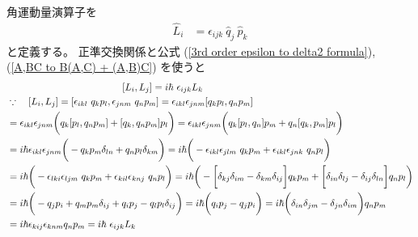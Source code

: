 角運動量演算子を
\begin{align}
    \hat{L}_i &= \epsilon_{ijk} \ \hat{q}_j \ \hat{p}_k
\end{align}
と定義する。
正準交換関係と公式
(\ref{3rd order epsilon to delta2 formula}),
(\ref{A,BC to B(A,C) + (A,B)C})
を使うと
\begin{align}
    &\qquad\qquad\qquad\qquad
    \qquad\qquad
    [
        \hat{L}_i, \hat{L}_j
    ]
    = i \hbar\ \epsilon_{ijk} \hat{L}_k
\label{angular momentum algebra}
\\&\because\quad
    [
        \hat{L}_i, \hat{L}_j
    ]
    =
    [
        \epsilon_{ikl} \ \hat{q}_k \hat{p}_l
        ,
        \epsilon_{jnm} \ \hat{q}_n \hat{p}_m
    ]
    =
    \epsilon_{ikl} \epsilon_{jnm}
    [
        \hat{q}_k \hat{p}_l
        ,
        \hat{q}_n \hat{p}_m
    ]
\notag\\&=
    \epsilon_{ikl} \epsilon_{jnm}
    \bigg(
        \hat{q}_k
        [
            \hat{p}_l
            ,
            \hat{q}_n \hat{p}_m
        ]
    +
        [
            \hat{q}_k
            ,
            \hat{q}_n \hat{p}_m
        ]
        \hat{p}_l
    \bigg)
=
    \epsilon_{ikl} \epsilon_{jnm}
    \bigg(
        \hat{q}_k
        [
            \hat{p}_l
            ,
            \hat{q}_n
        ]
        \hat{p}_m
    +
        \hat{q}_n
        [
            \hat{q}_k
            ,
            \hat{p}_m
        ]
        \hat{p}_l
    \bigg)
\notag\\&=
    i \hbar
    \epsilon_{ikl} \epsilon_{jnm}
    \bigg(
        -
        \hat{q}_k
        \hat{p}_m
        \delta_{ln}
    +
        \hat{q}_n
        \hat{p}_l
        \delta_{km}
    \bigg)
=
    i \hbar
    \bigg(
        -
        \epsilon_{ikl} \epsilon_{jlm}\ 
        \hat{q}_k
        \hat{p}_m
    +
        \epsilon_{ikl} \epsilon_{jnk}\ 
        \hat{q}_n
        \hat{p}_l
    \bigg)
\notag\\&=
    i \hbar
    \bigg(
        -
        \epsilon_{lki} \epsilon_{ljm}\ 
        \hat{q}_k
        \hat{p}_m
    +
        \epsilon_{kil} \epsilon_{knj}\ 
        \hat{q}_n
        \hat{p}_l
    \bigg)
=
    i \hbar
    \bigg(
        -
        \bigg[
            \delta_{kj}\delta_{im}
            -
            \delta_{km}\delta_{ij}
        \bigg]
        \hat{q}_k
        \hat{p}_m
    +
        \bigg[
            \delta_{in}\delta_{lj}
            -
            \delta_{ij}\delta_{ln}
        \bigg]
        \hat{q}_n
        \hat{p}_l
    \bigg)
\notag\\&=
    i \hbar
    \bigg(
        -
        \hat{q}_j
        \hat{p}_i
        +
        \hat{q}_m
        \hat{p}_m
        \delta_{ij}
    +
        \hat{q}_i
        \hat{p}_j
        -
        \hat{q}_l
        \hat{p}_l
        \delta_{ij}
    \bigg)
=
    i \hbar
    \bigg(
        \hat{q}_i
        \hat{p}_j
    -
        \hat{q}_j
        \hat{p}_i
    \bigg)
=
    i \hbar
    \bigg(
        \delta_{in}\delta_{jm}
    -
        \delta_{jn}\delta_{im}
    \bigg)
    \hat{q}_n
    \hat{p}_m
\notag\\&=
    i \hbar \epsilon_{kij} \epsilon_{knm}
    \hat{q}_n
    \hat{p}_m
= i \hbar\ \epsilon_{ijk} \hat{L}_k
\notag
\end{align}
